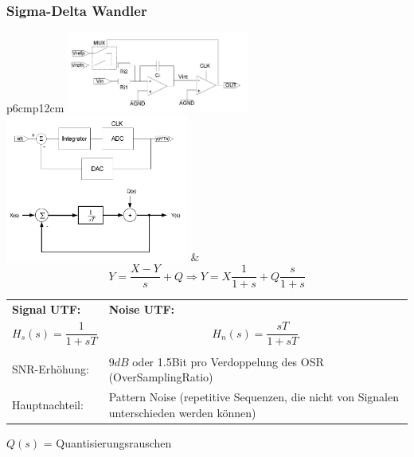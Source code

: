 \subsubsection{Sigma-Delta Wandler }
  \begin{longtable}{p{6cm}p{12cm}}
    \includegraphics[width=6cm, valign=t]{pictures/deltaSigma1} \newline 
    \includegraphics[width=6cm]{pictures/deltaSigma3} &
    \[Y=\frac{X-Y}{s}+Q\Rightarrow Y=X\frac{1}{1+s}+Q\frac{s}{1+s}\] \newline
    \begin{tabular}{p{3cm}p{9cm}}
      \textbf{Signal UTF:} &
      \textbf{Noise UTF:} \\
      
      \[ H_s(s) = \frac{1}{1+sT} \] &    
      \[ H_n(s) = \frac{sT}{1+sT} \] \\ \\
      
      SNR-Erhöhung: &
      $9dB$ oder 1.5Bit pro Verdoppelung des OSR (OverSamplingRatio) \\
      Hauptnachteil: &
      Pattern Noise (repetitive Sequenzen, die nicht von Signalen unterschieden werden können)
    \end{tabular}
    $Q(s)$ = Quantisierungsrauschen
    
  \end{longtable}

